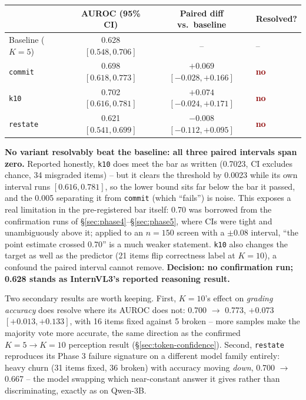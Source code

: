 \documentclass[11pt]{article}
\newcommand{\failed}[1]{\textcolor{darkred}{\textbf{#1}}}
\begin{document}
\begin{center}
\begin{tabular}{lccl}
\toprule
& AUROC (95\% CI) & Paired diff vs.\ baseline & Resolved? \\
\midrule
Baseline ($K=5$) & 0.628 $[0.548, 0.706]$ & -- & -- \\
\texttt{commit} & 0.698 $[0.618, 0.773]$ & $+0.069$ $[-0.028, +0.166]$ & \failed{no} \\
\texttt{k10} & 0.702 $[0.616, 0.781]$ & $+0.074$ $[-0.024, +0.171]$ & \failed{no} \\
\texttt{restate} & 0.621 $[0.541, 0.699]$ & $-0.008$ $[-0.112, +0.095]$ & \failed{no} \\
\bottomrule
\end{tabular}
\end{center}

\textbf{No variant resolvably beat the baseline: all three paired
intervals span zero.} Reported honestly, \texttt{k10} does meet the bar as
written (0.7023, CI excludes chance, 34 misgraded items) -- but it clears
the threshold by 0.0023 while its own interval runs $[0.616, 0.781]$, so
the lower bound sits far below the bar it passed, and the 0.005 separating
it from \texttt{commit} (which ``fails'') is noise. This exposes a real
limitation in the pre-registered bar itself: 0.70 was borrowed from the
confirmation runs of \S\ref{sec:phase4}--\S\ref{sec:phase5}, where CIs
were tight and unambiguously above it; applied to an $n=150$ screen with a
$\pm 0.08$ interval, ``the point estimate crossed 0.70'' is a much weaker
statement. \texttt{k10} also changes the target as well as the predictor
(21 items flip correctness label at $K=10$), a confound the paired
interval cannot remove. \textbf{Decision: no confirmation run; 0.628
stands as InternVL3's reported reasoning result.}

Two secondary results are worth keeping. First, $K=10$'s effect on
\emph{grading accuracy} does resolve where its AUROC does not: 0.700
$\rightarrow$ 0.773, $+0.073$ $[+0.013, +0.133]$, with 16 items fixed
against 5 broken -- more samples make the majority vote more accurate,
the same direction as the confirmed $K=5 \rightarrow K=10$ perception
result (\S\ref{sec:token-confidence}). Second, \texttt{restate}
reproduces its Phase 3 failure signature on a different model family
entirely: heavy churn (31 items fixed, 36 broken) with accuracy moving
\emph{down}, 0.700 $\rightarrow$ 0.667 -- the model swapping which
near-constant answer it gives rather than discriminating, exactly as on
Qwen-3B.
\end{document}
